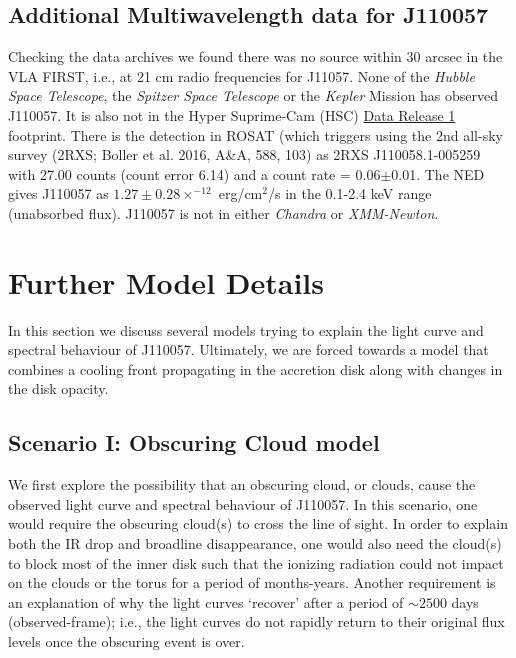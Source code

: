 \documentclass[11pt,a4paper]{article}
\begin{document}
\subsection*{Additional Multiwavelength data for J110057}
Checking the data archives we found there was no source within 30
arcsec in the VLA FIRST, i.e., at 21 cm radio frequencies for J11057.
None of the {\it Hubble Space Telescope}, the {\it Spitzer Space
Telescope} or the {\it Kepler} Mission has observed J110057.  It is
also not in the Hyper Suprime-Cam (HSC)
\href{https://hsc-release.mtk.nao.ac.jp/doc/}{Data Release 1}
\citep{Aihara2017} footprint. There is the detection in ROSAT (which
triggers using the 2nd all-sky survey (2RXS; Boller et al. 2016, A\&A,
588, 103) as 2RXS J110058.1-005259 with 27.00 counts (count error
6.14) and a count rate = 0.06$\pm$0.01. The NED gives J110057 as
$1.27\pm0.28 \times^{-12}$ erg/cm$^{2}$/s in the 0.1-2.4 keV range
(unabsorbed flux). J110057 is not in either {\it Chandra} or {\it
XMM-Newton}.


\section*{Further Model Details}
In this section we discuss several models trying to explain the light
curve and spectral behaviour of J110057. Ultimately, we are forced
towards a model that combines a cooling front propagating in the
accretion disk along with changes in the disk opacity.

\subsection*{Scenario I: Obscuring Cloud model}
We first explore the possibility that an obscuring cloud, or clouds,
cause the observed light curve and spectral behaviour of J110057.  In
this scenario, one would require the obscuring cloud(s) to cross the
line of sight. In order to explain both the IR drop and broadline
disappearance, one would also need the cloud(s) to block most of the
inner disk such that the ionizing radiation could not impact on the
clouds or the torus for a period of months-years.  Another requirement
is an explanation of why the light curves `recover' after a period of
$\sim 2500$ days (observed-frame); i.e., the light curves do not
rapidly return to their original flux levels once the obscuring event
is over.
\end{document}

